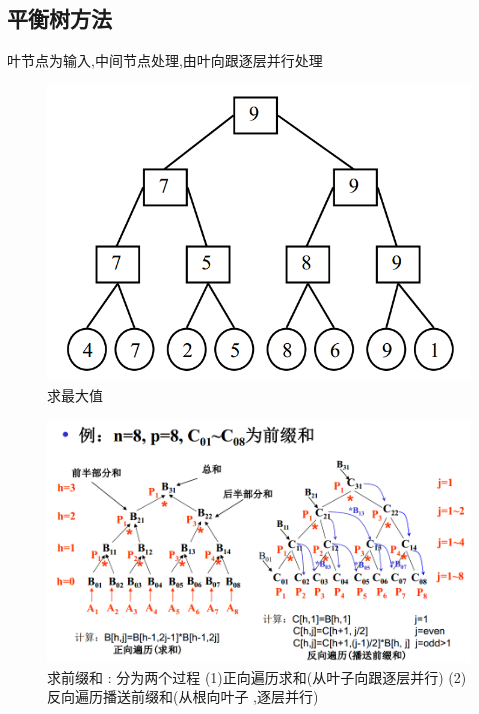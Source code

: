 \documentclass[UTF8,a4paper]{ctexart}
\begin{document}
  \subsection{平衡树方法}
  叶节点为输入,中间节点处理,由叶向跟逐层并行处理
  \begin{figure}[H]
    \centering
    \includegraphics[scale = 0.3]{assets/ParallelComputing_32d59.png}
    \caption{求最大值}
  \end{figure}

  \begin{figure}[H]
    \centering
    \includegraphics[scale = 0.3]{assets/ParallelComputing_2f254.png}
    \caption{求前缀和 : 分为两个过程 (1)正向遍历求和(从叶子向跟逐层并行) (2)反向遍历播送前缀和(从根向叶子 ,逐层并行)}
  \end{figure}
\end{document}
